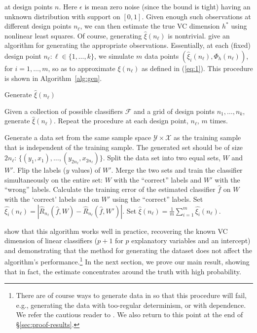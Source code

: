 \documentclass[11pt]{article}
\newcommand{\F}{\mathcal{F}}
\renewcommand{\hat}[1]{\widehat{#1}}
\begin{document}
at design points $n$. Here $\epsilon$ is mean zero noise (since the bound is
tight) having an unknown distribution with support on $[0,1]$. Given enough
such observations at different design points $n_\ell$, we can then estimate the
true VC dimension $h^*$ using nonlinear least squares. Of course, generating
$\widehat{\xi}(n_\ell)$ is nontrivial. \citet{VapnikLevin1994} give an
algorithm for generating the appropriate observations. Essentially, at each
(fixed) design point $n_\ell: \ell \in \{1,\ldots,k\}$, we simulate $m$ data
points $(\widehat{\xi}_i(n_\ell),\Phi_h(n_\ell))$, for $i=1,\ldots,m$, so as to
approximate $\xi(n_\ell)$ as defined in (\ref{eq:1}). This procedure is shown
in Algorithm~\ref{alg:gen}.
\begin{algorithm*}[t]
  \caption{Generate $\widehat{\xi}(n_\ell)$}
  Given a collection of possible classifiers $\F$ and a grid of design points
  $n_1,\ldots,n_k$, generate $\widehat{\xi}(n_\ell)$. Repeat the procedure at
  each design point, $n_\ell$, $m$ times.
  \begin{algorithmic}[1]
    \STATE Generate a data set from the same sample space
    $\mathcal{Y}\times\mathcal{X}$ as the training sample that is
    independent of the training sample. The generated set should be of
    size $2n_\ell$: $\{(y_1,x_1),\ldots,(y_{2n_\ell},x_{2n_\ell})\}$. 
    \STATE Split the data set into two equal sets, $W$ and $W'$.
    \STATE Flip the labels ($y$ values) of $W'$.
    \STATE Merge the two sets and train the classifier simultaneously on the entire
    set: $W$ with the ``correct'' labels and $W'$ with the ``wrong'' labels.
    \STATE Calculate the training error of the estimated classifier
    $\widehat{f}$ on $W$ with the `correct' labels and on $W'$ using the
    ``correct'' labels.
    \STATE Set $\widehat{\xi_i}(n_\ell)=|\widehat{R}_{n_\ell}(\hat{f},W) - \widehat{R}_{n_\ell}(\hat{f},W')|$.
    \STATE Set $\widehat{\xi}(n_\ell)=\frac{1}{m} \sum_{i=1}^m \widehat{\xi_i}(n_\ell)$.
  \end{algorithmic} 
  \label{alg:gen}
\end{algorithm*}
\citet{VapnikLevin1994} show that this algorithm works well in practice,
recovering the known VC dimension of linear classifiers ($p+1$ for $p$
explanatory variables and an intercept) and demonstrating that the method for
generating the dataset does not affect the algorithm's
performance.\footnote{There are of course ways to generate data in so
  that this procedure will fail, e.g., generating the data with too-regular
  determinism, or with dependence.  We refer the cautious reader to
  \citet{VapnikLevin1994}. We also return to this point at the end of
  \S\ref{sec:proof-results}.}  In the next section, we prove our main
result, 
showing that in fact, the estimate concentrates around the truth with high
probability.
\end{document}
